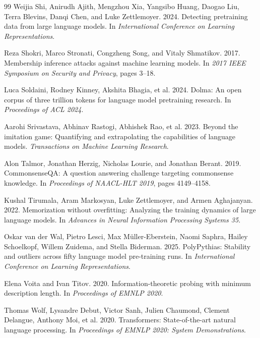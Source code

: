 \documentclass[10pt,twocolumn,letterpaper]{article}
\begin{document}
\begin{thebibliography}{99}
Weijia Shi, Anirudh Ajith, Mengzhou Xia, Yangsibo Huang, Daogao Liu, Terra Blevins, Danqi Chen, and Luke Zettlemoyer. 2024.
Detecting pretraining data from large language models.
In \emph{International Conference on Learning Representations}.

Reza Shokri, Marco Stronati, Congzheng Song, and Vitaly Shmatikov. 2017.
Membership inference attacks against machine learning models.
In \emph{2017 IEEE Symposium on Security and Privacy}, pages 3--18.

Luca Soldaini, Rodney Kinney, Akshita Bhagia, et al. 2024.
Dolma: An open corpus of three trillion tokens for language model pretraining research.
In \emph{Proceedings of ACL 2024}.

Aarohi Srivastava, Abhinav Rastogi, Abhishek Rao, et al. 2023.
Beyond the imitation game: Quantifying and extrapolating the capabilities of language models.
\emph{Transactions on Machine Learning Research}.

Alon Talmor, Jonathan Herzig, Nicholas Lourie, and Jonathan Berant. 2019.
CommonsenseQA: A question answering challenge targeting commonsense knowledge.
In \emph{Proceedings of NAACL-HLT 2019}, pages 4149--4158.

Kushal Tirumala, Aram Markosyan, Luke Zettlemoyer, and Armen Aghajanyan. 2022.
Memorization without overfitting: Analyzing the training dynamics of large language models.
In \emph{Advances in Neural Information Processing Systems 35}.

Oskar van der Wal, Pietro Lesci, Max M\"uller-Eberstein, Naomi Saphra, Hailey Schoelkopf, Willem Zuidema, and Stella Biderman. 2025.
PolyPythias: Stability and outliers across fifty language model pre-training runs.
In \emph{International Conference on Learning Representations}.

Elena Voita and Ivan Titov. 2020.
Information-theoretic probing with minimum description length.
In \emph{Proceedings of EMNLP 2020}.

Thomas Wolf, Lysandre Debut, Victor Sanh, Julien Chaumond, Clement Delangue, Anthony Moi, et al. 2020.
Transformers: State-of-the-art natural language processing.
In \emph{Proceedings of EMNLP 2020: System Demonstrations}.


\end{thebibliography}
\end{document}
